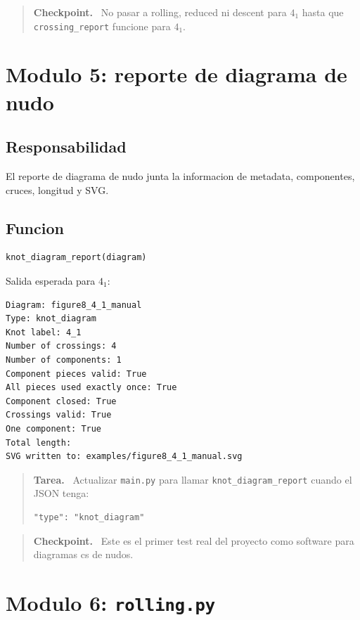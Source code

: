 \documentclass[11pt,letterpaper]{amsart}
\newenvironment{checkpoint}
{\par\medskip\noindent\begin{quote}\textbf{Checkpoint.}\ }
{\end{quote}\par\medskip}
\newenvironment{taskbox}
{\par\medskip\noindent\begin{quote}\textbf{Tarea.}\ }
{\end{quote}\par\medskip}
\begin{document}
\begin{checkpoint}
No pasar a rolling, reduced ni descent para \(4_1\) hasta que
\texttt{crossing\_report} funcione para \(4_1\).
\end{checkpoint}

\section{Modulo 5: reporte de diagrama de nudo}

\subsection{Responsabilidad}

El reporte de diagrama de nudo junta la informacion de metadata, componentes,
cruces, longitud y SVG.

\subsection{Funcion}

\begin{verbatim}
knot_diagram_report(diagram)
\end{verbatim}

Salida esperada para \(4_1\):
\begin{verbatim}
Diagram: figure8_4_1_manual
Type: knot_diagram
Knot label: 4_1
Number of crossings: 4
Number of components: 1
Component pieces valid: True
All pieces used exactly once: True
Component closed: True
Crossings valid: True
One component: True
Total length:
SVG written to: examples/figure8_4_1_manual.svg
\end{verbatim}

\begin{taskbox}
Actualizar \texttt{main.py} para llamar \texttt{knot\_diagram\_report} cuando el
JSON tenga:
\begin{verbatim}
"type": "knot_diagram"
\end{verbatim}
\end{taskbox}

\begin{checkpoint}
Este es el primer test real del proyecto como software para diagramas cs de
nudos.
\end{checkpoint}

\section{Modulo 6: \texttt{rolling.py}}
\end{document}
